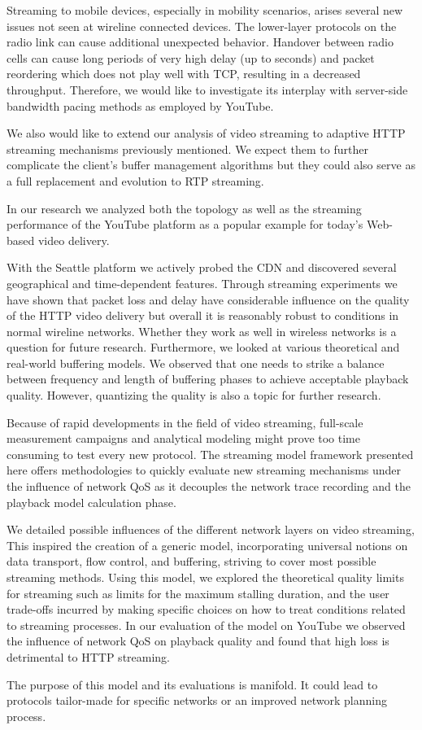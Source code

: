 Streaming to mobile devices, especially in mobility scenarios, arises several new issues not seen at wireline connected devices. The lower-layer protocols on the radio link can cause additional unexpected behavior. Handover between radio cells can cause long periods of very high delay (up to seconds) and packet reordering which does not play well with TCP, resulting in a decreased throughput. Therefore, we would like to investigate its interplay with server-side bandwidth pacing methods as employed by YouTube.

We also would like to extend our analysis of video streaming to adaptive HTTP streaming mechanisms previously mentioned. We expect them to further complicate the client's buffer management algorithms but they could also serve as a full replacement and evolution to RTP streaming.

In our research we analyzed both the topology as well as the streaming performance of the YouTube platform as a popular example for today's Web-based video delivery. 

With the Seattle platform we actively probed the CDN and discovered several geographical and time-dependent features. Through streaming experiments we have shown that packet loss and delay have considerable influence on the quality of the HTTP video delivery but overall it is reasonably robust to conditions in normal wireline networks. Whether they work as well in wireless networks is a question for future research. Furthermore, we looked at various theoretical and real-world buffering models. We observed that one needs to strike a balance between frequency and length of buffering phases to achieve acceptable playback quality. However, quantizing the quality is also a topic for further research.

Because of rapid developments in the field of video streaming, full-scale measurement campaigns and analytical modeling might prove too time consuming to test every new protocol. The streaming model framework presented here offers methodologies to quickly evaluate new streaming mechanisms under the influence of network QoS as it decouples the network trace recording and the playback model calculation phase.

We detailed possible influences of the different network layers on video streaming, This inspired the creation of a generic model, incorporating universal notions on data transport, flow control, and buffering, striving to cover most possible streaming methods. Using this model, we explored the theoretical quality limits for streaming such as limits for the maximum stalling duration, and the user trade-offs incurred by making specific choices on how to treat conditions related to streaming processes. In our evaluation of the model on YouTube we observed the influence of network QoS on playback quality and found that high loss is detrimental to HTTP streaming.

The purpose of this model and its evaluations is manifold. It could lead to protocols tailor-made for specific networks or an improved network planning process.
